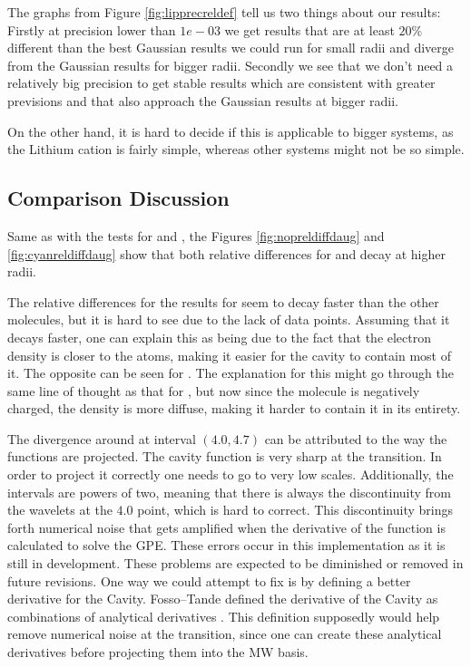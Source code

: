 \documentclass[../master_thesis.tex]{subfiles}
\begin{document}
The graphs from Figure \ref{fig:lipprecreldef} tell us two things about our results:
Firstly at precision lower than $1e-03$ we get results that are at least $20\%$ different
than the best Gaussian results we could run for small radii and diverge from the
Gaussian results for bigger radii. Secondly we see that we don't need a relatively big
precision to get stable results which are consistent with greater previsions and
that also approach the Gaussian results at bigger radii.

On the other hand, it is hard to decide if this is applicable to bigger systems,
as the Lithium cation is fairly simple, whereas
other systems might not be so simple.

\subsection{Comparison Discussion}
Same as with the tests for  and , the Figures \ref{fig:nopreldiffdaug}
and  \ref{fig:cyanreldiffdaug} show that both relative differences for 
and  decay at higher radii.

The relative differences for the results for   seem to decay faster
than the other molecules, but it
is hard to see due to the lack of data points. Assuming that it decays faster,
one can explain this as being due to the fact that the electron density is
closer to the atoms, making it easier for the cavity to contain most of it.
The opposite can be seen for . The explanation for this might go through
the same line of thought as that for , but now since the molecule is negatively
charged, the density is more diffuse, making it harder to contain it in its entirety.

The divergence around at interval $(4.0, 4.7)$ can be attributed to the way the
functions are projected. The cavity function is very sharp at the transition. In order to
project it correctly one needs to go to very low scales.
Additionally, the intervals are
powers of two, meaning that there is always the discontinuity from the wavelets at the
$4.0$ point, which is hard to correct. This discontinuity brings forth numerical
noise that gets amplified when the derivative of the function is calculated to solve the
\ac{GPE}.
These errors occur in this implementation as it is still in development. These
problems are expected to be diminished or removed in future revisions. One way we
could attempt to fix is by defining a better derivative for the Cavity.
Fosso--Tande defined the derivative of the Cavity as combinations of analytical
derivatives \cite{FossoTande:2013ka}. This definition supposedly would help
remove numerical noise at the transition, since one can create these analytical
derivatives before projecting them into the \ac{MW} basis.
\end{document}
